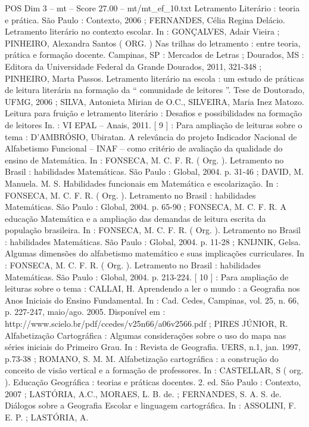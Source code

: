 \begin{textsample}{POS Dim 3 – mt – Score 27.00 – mt/mt\_ef\_10.txt}
Letramento Literário : teoria e prática.
São Paulo : Contexto, 2006 ; FERNANDES, Célia Regina Delácio.
Letramento literário no contexto escolar.
In : GONÇALVES, Adair Vieira ; PINHEIRO, Alexandra Santos ( ORG. ) Nas trilhas do letramento : entre teoria, prática e formação docente.
Campinas, SP : Mercados de Letras ; Dourados, MS : Editora da Universidade Federal da Grande Dourados, 2011, 321-348 ; PINHEIRO, Marta Passos.
Letramento literário na escola : um estudo de práticas de leitura literária na formação da “ comunidade de leitores ”.
Tese de Doutorado, UFMG, 2006 ; SILVA, Antonieta Mirian de O.C., SILVEIRA, Maria Inez Matozo.
Leitura para fruição e letramento literário : Desafios e possibilidades na formação de leitores In. : VI EPAL – Anais, 2011. [ 9 ] : Para ampliação de leituras sobre o tema : D'AMBRÓSIO, Ubiratan.
A relevância do projeto Indicador Nacional de Alfabetismo Funcional – INAF – como critério de avaliação da qualidade do ensino de Matemática.
In : FONSECA, M.
C.
F.
R. ( Org. ).
Letramento no Brasil : habilidades Matemáticas.
São Paulo : Global, 2004. p. 31-46 ; DAVID, M.
Manuela.
M.
S.
Habilidades funcionais em Matemática e escolarização.
In : FONSECA, M.
C.
F.
R. ( Org. ).
Letramento no Brasil : habilidades Matemáticas.
São Paulo : Global, 2004. p. 65-90 ; FONSECA, M.
C.
F.
R.
A educação Matemática e a ampliação das demandas de leitura escrita da população brasileira.
In : FONSECA, M.
C.
F.
R. ( Org. ).
Letramento no Brasil : habilidades Matemáticas.
São Paulo : Global, 2004. p. 11-28 ; KNIJNIK, Gelsa.
Algumas dimensões do alfabetismo matemático e suas implicações curriculares.
In : FONSECA, M.
C.
F.
R. ( Org. ).
Letramento no Brasil : habilidades Matemáticas.
São Paulo : Global, 2004. p. 213-224. [ 10 ] : Para ampliação de leituras sobre o tema : CALLAI, H.
Aprendendo a ler o mundo : a Geografia nos Anos Iniciais do Ensino Fundamental.
In : Cad.
Cedes, Campinas, vol. 25, n. 66, p. 227-247, maio/ago. 2005.
Disponível em : http://www.scielo.br/pdf/ccedes/v25n66/a06v2566.pdf ; PIRES JÚNIOR, R.
Alfabetização Cartográfica : Algumas considerações sobre o uso do mapa nas séries iniciais do Primeiro Grau.
In : Revista de Geografia.
UERS, n.1, jan. 1997, p.73-38 ; ROMANO, S.
M.
M.
Alfabetização cartográfica : a construção do conceito de visão vertical e a formação de professores.
In : CASTELLAR, S ( org. ).
Educação Geográfica : teorias e práticas docentes. 2. ed.
São Paulo : Contexto, 2007 ; LASTÓRIA, A.C., MORAES, L.
B. de. ; FERNANDES, S.
A.
S. de.
Diálogos sobre a Geografia Escolar e linguagem cartográfica.
In : ASSOLINI, F.
E.
P. ; LASTÓRIA, A.

\end{textsample}
